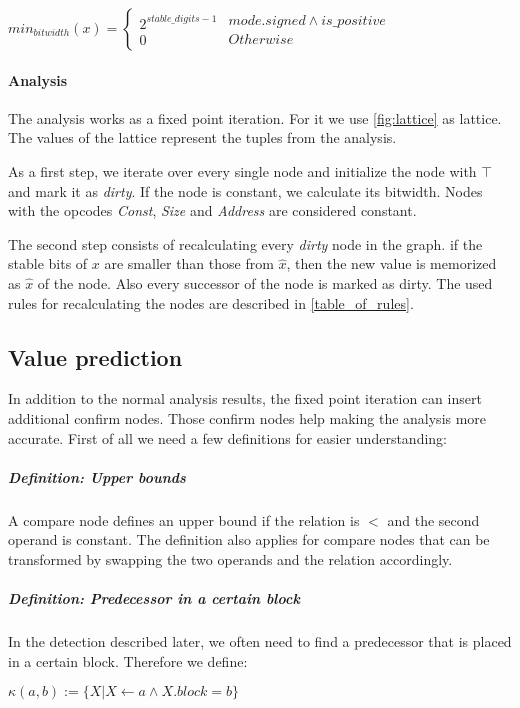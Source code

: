 $
min_{bitwidth}(x)=
\left\{
\begin{array}{l}2^{stable\_digits-1}\\0\end{array}
\begin{array}{l} {mode.signed \wedge is\_positive} \\ {Otherwise} \end{array}
\right.
$



\paragraph{Analysis}
\label{analysis_explain}
The analysis works as a fixed point iteration. For it we use  \autoref{fig:lattice} as lattice. The values of the lattice represent the tuples from the analysis.

As a first step, we iterate over every single node and initialize the node with $\top$ and mark it as \textit{dirty}. If the node is constant, we calculate its bitwidth. Nodes with the opcodes \textit{Const}, \textit{Size} and \textit{Address} are considered constant.

The second step consists of recalculating every \textit{dirty} node in the graph. 
if the stable bits of $x$ are smaller than those from $\hat{x}$, 
then the new value is memorized as $\hat{x}$ of the node. Also every successor of the node is marked as dirty. The used rules for recalculating the nodes are described in \autoref{table_of_rules}.

\subsection{Value prediction}
In addition to the normal analysis results, the fixed point iteration can insert additional confirm nodes. Those confirm nodes help making the analysis more accurate.
First of all we need a few definitions for easier understanding:



\subparagraph{Definition: Upper bounds}
A compare node defines an upper bound if the relation is $<$ and the second operand is constant.\newline
The definition also applies for compare nodes that can be transformed by swapping the two operands and the relation accordingly.

\subparagraph{Definition: Predecessor in a certain block}
In the detection described later, we often need to find a predecessor that is placed in a certain block. Therefore we define:
\begin{center}
$\kappa(a, b) := \{X| X \leftarrow a \wedge X.block = b \}$ 
\end{center}

